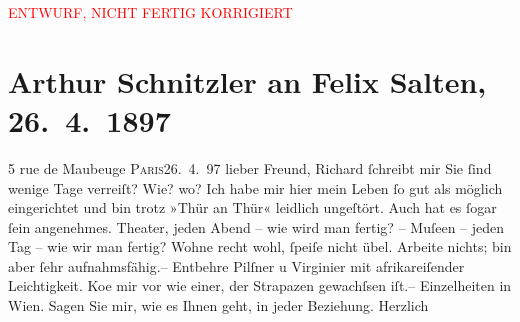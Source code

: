 
\begin{center}
            \textcolor{red}{ENTWURF, NICHT FERTIG KORRIGIERT}
                      \end{center}
            
         
         \renewcommand{\erwaehntePersonen}{Personen: Richard Beer-Hofmann, Felix Salten}
         \renewcommand{\erwaehnteOrte}{Orte: Paris, Wien, rue de Maubeuge}
         \renewcommand{\erwaehnteWerke}{}
               \section[Arthur Schnitzler an Felix Salten, 26. 4. 1897]{ Arthur Schnitzler an Felix Salten, 26. 4. 1897}\nopagebreak{}\rehead{ }\begin{ledgroupsized}[t]{13cm}\normalsize\beginnumbering \toendnotes[C]{\smallbreak\pagebreak[2]} 
\pstart
           \noindent{}\raggedleft{}{\pb}5 rue de Maubeuge\pend
           \pstart
           \raggedleft{}\textsc{Paris26. 4. 97}\pend
           \pstart{}lieber Freund,\pend\pstart
           Richard ſchreibt mir Sie ſind wenige Tage
               verreiſt? Wie? wo? Ich habe mir hier mein Leben ſo gut als möglich eingerichtet und
               bin trotz »Thür an Thür« leidlich {\pb}ungeſtört. Auch hat es ſogar ſein angenehmes. Theater, jeden Abend – wie wird man
               fertig? – Muſeen – jeden Tag – wie wir man fertig? Wohne recht wohl, ſpeiſe nicht
               übel. Arbeite nichts; bin aber ſehr aufnahmsfähig.– {\pb}Entbehre Pilſner u Virginier mit
               afrikareiſender Leichtigkeit. Ko{\geminationm}e mir vor wie einer,
               der Strapazen gewachſsen iſt.– \pend
           \pstart
           Einzelheiten in Wien. \pend
           \pstart
           Sagen Sie mir, wie es Ihnen geht, in jeder Beziehung. Herzlich \pend
           
         
         \endnumbering{}\end{ledgroupsized}\begin{anhang}\end{anhang}\newcommand{\dateiname}{L02963}\newcommand{\titel}{Arthur Schnitzler an Felix Salten, 26. 4. 1897}\newcommand{\editorInnen}{Martin Anton Müller und Laura Untner}
      
